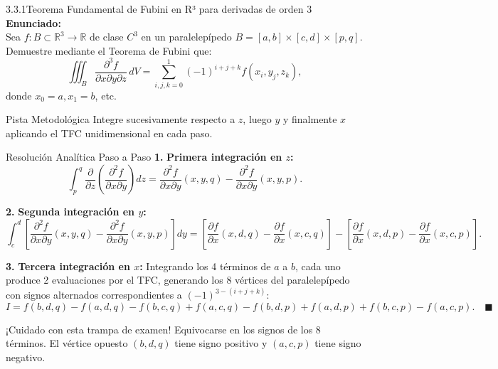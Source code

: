 \documentclass[11pt,a4paper]{article}
\begin{document}
\begin{nivelbox}{3.3.1}{Teorema Fundamental de Fubini en R³ para derivadas de orden 3}
\textbf{Enunciado:}\\
Sea $f: B \subset \mathbb{R}^3 \to \mathbb{R}$ de clase $C^3$ en un paralelepípedo $B = [a,b] \times [c,d] \times [p,q]$. Demuestre mediante el Teorema de Fubini que:
\[\iiint_B \frac{\partial^3 f}{\partial x \partial y \partial z} \, dV = \sum_{i,j,k=0}^1 (-1)^{i+j+k} f(x_i, y_j, z_k),\]
donde $x_0=a, x_1=b$, etc.

\begin{observacionbox}{Pista Metodológica}
Integre sucesivamente respecto a $z$, luego $y$ y finalmente $x$ aplicando el TFC unidimensional en cada paso.
\end{observacionbox}

\begin{ejerciciobox}{Resolución Analítica Paso a Paso}
\smallskip\noindent\textbf{1.} \textbf{Primera integración en $z$:}
\[\int_p^q \frac{\partial}{\partial z} \left( \frac{\partial^2 f}{\partial x \partial y} \right) dz = \frac{\partial^2 f}{\partial x \partial y}(x, y, q) - \frac{\partial^2 f}{\partial x \partial y}(x, y, p).\]

\smallskip\noindent\textbf{2.} \textbf{Segunda integración en $y$:}
\[\int_c^d \left[ \frac{\partial^2 f}{\partial x \partial y}(x, y, q) - \frac{\partial^2 f}{\partial x \partial y}(x, y, p) \right] dy = \left[ \frac{\partial f}{\partial x}(x, d, q) - \frac{\partial f}{\partial x}(x, c, q) \right] - \left[ \frac{\partial f}{\partial x}(x, d, p) - \frac{\partial f}{\partial x}(x, c, p) \right].\]

\smallskip\noindent\textbf{3.} \textbf{Tercera integración en $x$:}
Integrando los 4 términos de $a$ a $b$, cada uno produce 2 evaluaciones por el TFC, generando los 8 vértices del paralelepípedo con signos alternados correspondientes a $(-1)^{3 - (i+j+k)}$:
\[I = f(b,d,q) - f(a,d,q) - f(b,c,q) + f(a,c,q) - f(b,d,p) + f(a,d,p) + f(b,c,p) - f(a,c,p). \quad \blacksquare\]
\end{ejerciciobox}

\begin{errorbox}{¡Cuidado con esta trampa de examen!}
Equivocarse en los signos de los 8 términos. El vértice opuesto $(b,d,q)$ tiene signo positivo y $(a,c,p)$ tiene signo negativo.
\end{errorbox}
\end{nivelbox}
\bigskip
\end{document}
